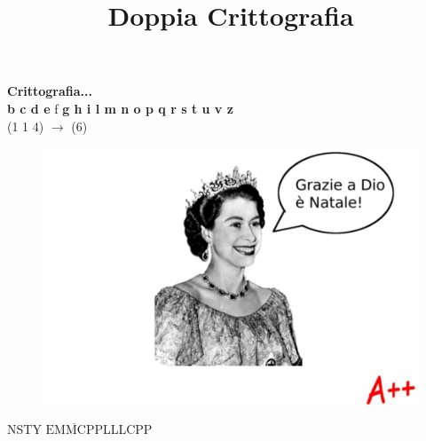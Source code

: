 \documentclass{article}
\title{Doppia Crittografia}
\date{}
\begin{document}
\maketitle
\thispagestyle{empty}
\begin{center}
\large{\textbf{Crittografia...\\}}
\vspace{.3cm}
 \textbf{b c d e} f \textbf{g h i l m n o p q r s t u v z}\\
(1 1 4) $\rightarrow$ (6)

\end{center}



\begin{center}
\begin{figure}[H]
\centering
\includegraphics[width=1\columnwidth]{finalqueen.pdf}
\end{figure}
\large{NSTY $\overline{\text{EMMCPP}}$LLLCPP}
\end{center}
\end{document}
